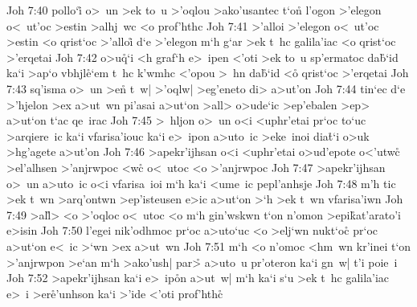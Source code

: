 \vs Joh 7:40
pollo`i\r{}
o>~un
>ek
to~u
>'oqlou
>ako'usantec
t`on\r{}
l'ogon
>'elegon
o<~ut'oc
>estin
>alhj~wc
<o
prof'hthc\bibvsend
\vs Joh 7:41
>'alloi
>'elegon
o<~ut'oc
>estin
<o
qrist`oc
>'alloi\r{}
d`e
>'elegon
m`h
g`ar
>ek
t~hc
galila'iac
<o
qrist`oc
>'erqetai\bibvsend
\vs Joh 7:42
o>u\r{q}`i
<h
graf`h
e>~ipen
<'oti
>ek
to~u
sp'ermatoc
da\r{b}`id
ka`i
>ap`o
vbhjl\r{e}`em
t~hc
k'wmhc
<'opou
>~hn
da\r{b}`id
<o\r{}
qrist`oc
>'erqetai\bibvsend
\vs Joh 7:43
sq'isma
o>~un
>en\r{}
t~w|
>'oqlw|
>eg'eneto
di>
a>ut'on\bibvsend
\vs Joh 7:44
tin`ec
d`e
>'hjelon
>ex
a>ut~wn
pi'asai
a>ut`on
>all>
o>ude`ic
>ep'ebalen
>ep>
a>ut`on
t`ac
qe~irac\bibvsend
\vs Joh 7:45
>~hljon
o>~un
o<i
<uphr'etai
pr`oc
to`uc
>arqiere~ic
ka`i
vfarisa'iouc
ka`i
e>~ipon
a>uto~ic
>eke~inoi
dia\r{t}`i
o>uk
>hg'agete
a>ut'on\bibvsend
\vs Joh 7:46
>apekr'ijhsan
o<i
<uphr'etai
o>ud'epote
o<'utwc\r{}
>el'alhsen
>'anjrwpoc
<wc\r{}
o<~utoc
<o
>'anjrwpoc\bibvsend
\vs Joh 7:47
>apekr'ijhsan
o>~un
a>uto~ic
o<i
vfarisa~ioi
m`h
ka`i
<ume~ic
pepl'anhsje\bibvsend
\vs Joh 7:48
m'h
tic
>ek
t~wn
>arq'ontwn
>ep'isteusen
e>ic
a>ut`on
>`h
>ek
t~wn
vfarisa'iwn\bibvsend
\vs Joh 7:49
>al\r{l}>
<o
>'oqloc
o<~utoc
<o
m`h
gin'wskwn
t`on
n'omon
>epi\r{k}at'arato'i
e>isin\bibvsend
\vs Joh 7:50
l'egei
nik'odhmoc
pr`oc
a>uto`uc
<o
>elj`wn
nukt`oc\r{}
pr`oc
a>ut`on
e<~ic
>`wn
>ex
a>ut~wn\bibvsend
\vs Joh 7:51
m`h
<o
n'omoc
<hm~wn
kr'inei
t`on
>'anjrwpon
>e`an
m`h
>ako'ush|
par>\r{}
a>uto~u
pr'oteron
ka`i
gn~w|
t'i
poie~i\bibvsend
\vs Joh 7:52
>apekr'ijhsan
ka`i
e>~ip\r{o}n
a>ut~w|
m`h
ka`i
s`u
>ek
t~hc
galila'iac
e>~i
>er\r{e}'unhson
ka`i
>'ide
<'oti
prof'hthc\r{}
